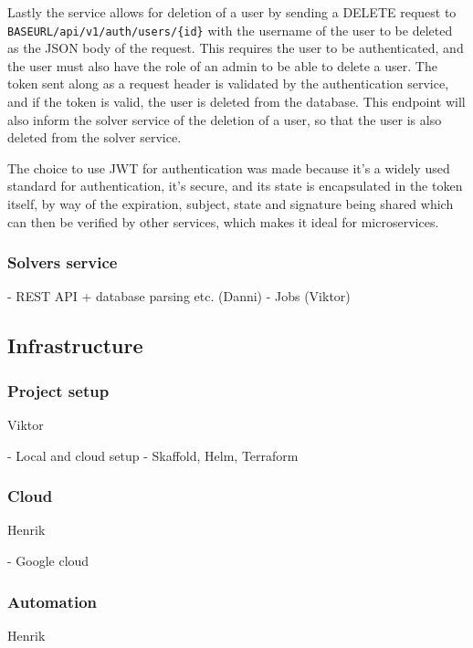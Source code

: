\documentclass[a4paper,12pt]{article}
\begin{document}
Lastly the service allows for deletion of a user by sending a DELETE request to \verb|BASEURL/api/v1/auth/users/{id}| with the username of the user to be deleted as the JSON body of the request.
This requires the user to be authenticated, and the user must also have the role of an admin to be able to delete a user. 
The token sent along as a request header is validated by the authentication service, and if the token is valid, the user is deleted from the database.
This endpoint will also inform the solver service of the deletion of a user, so that the user is also deleted from the solver service.

\bigskip

The choice to use JWT for authentication was made because it's a widely used standard for authentication,
it's secure, and its state is encapsulated in the token itself, by way of the expiration, subject, state and signature being shared
which can then be verified by other services,
which makes it ideal for microservices.

\subsubsection{Solvers service}

- REST API + database parsing etc. (Danni)
- Jobs (Viktor)

\subsection{Infrastructure}

\subsubsection{Project setup}
\label{subsec:project-setup}

Viktor

- Local and cloud setup
- Skaffold, Helm, Terraform

\subsubsection{Cloud}

Henrik

- Google cloud

\subsubsection{Automation}

Henrik
\end{document}
